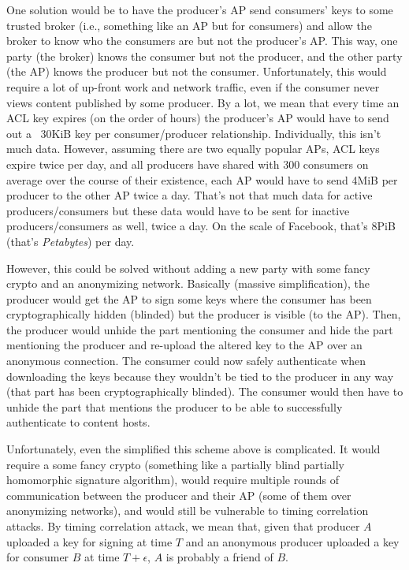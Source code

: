 \documentclass[pdftex,12pt,a4papaer,twoside,notitlepage]{report}
\begin{document}
One solution would be to have the producer's AP send consumers' keys to some
trusted broker (i.e., something like an AP but for consumers) and allow the
broker to know who the consumers are but not the producer's AP. This way, one
party (the broker) knows the consumer but not the producer, and the other party
(the AP) knows the producer but not the consumer. Unfortunately, this would
require a lot of up-front work and network traffic, even if the consumer never
views content published by some producer. By a lot, we mean that every time an
ACL key expires (on the order of hours) the producer's AP would have to send out
a ~30KiB key per consumer/producer relationship. Individually, this isn't much
data. However, assuming there are two equally popular APs, ACL keys expire twice
per day, and all producers have shared with 300 consumers on average over the
course of their existence, each AP would have to send 4MiB per producer to the
other AP twice a day. That's not that much data for active producers/consumers
but these data would have to be sent for inactive producers/consumers as well,
twice a day. On the scale of Facebook, that's 8PiB (that's \emph{Petabytes}) per
day.

However, this could be solved without adding a new party with some fancy crypto
and an anonymizing network. Basically (massive simplification), the producer
would get the AP to sign some keys where the consumer has been cryptographically
hidden (blinded) but the producer is visible (to the AP). Then, the producer
would unhide the part mentioning the consumer and hide the part mentioning the
producer and re-upload the altered key to the AP over an anonymous connection.
The consumer could now safely authenticate when downloading the keys because
they wouldn't be tied to the producer in any way (that part has been
cryptographically blinded). The consumer would then have to unhide the part that
mentions the producer to be able to successfully authenticate to content hosts.

Unfortunately, even the simplified this scheme above is complicated. It would
require a some fancy crypto (something like a partially blind partially
homomorphic signature algorithm), would require multiple rounds of communication
between the producer and their AP (some of them over anonymizing networks), and
would still be vulnerable to timing correlation attacks. By timing correlation
attack, we mean that, given that producer $A$ uploaded a key for signing at time
$T$ and an anonymous producer uploaded a key for consumer $B$ at time
$T+\epsilon$, $A$ is probably a friend of $B$.
\end{document}
